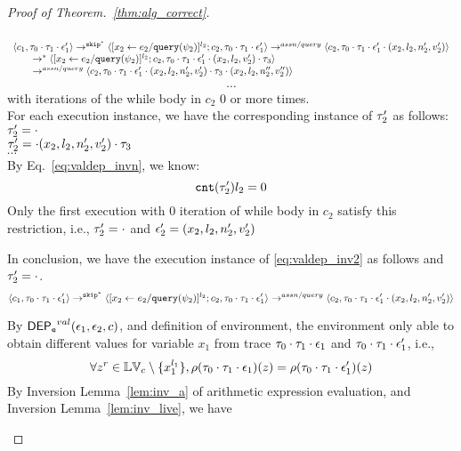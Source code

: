 \begin{proof}[Proof of Theorem.~\ref{thm:alg_correct}]
\begin{case}[$P(\cdot)$]
\begin{subproof}[Subproof]
\begin{enumerate}
\[ \]
%
  \[
  \begin{array}{l}
  \langle c_1, \mathtt{\tau}_0 \cdot \mathtt{\tau}_1 \cdot \mathtt{\epsilon}_1' \rangle 
  \rightarrow^{\mathtt{skip}^*} 
  \langle [\mathrel{ {x}_2 \leftarrow e_2 / {\tt query}(\psi_2) }]^{l_2} ; {c}_2, \mathtt{\tau}_0 \cdot \mathtt{\tau}_1 \cdot \mathtt{\epsilon}_1' \rangle 
  \rightarrow^{assn/query} 
  \langle {c}_2,  \mathtt{\tau}_0 \cdot \mathtt{\tau}_1 \cdot \mathtt{\epsilon}_1' \cdot (x_2, l_2, n_2', v_2') \rangle 
  \\ \qquad
  \rightarrow^{*} 
  \langle [\mathrel{ {x}_2 \leftarrow e_2 / {\tt query}(\psi_2) }]^{l_2} ; {c}_2, 
  \mathtt{\tau}_0 \cdot \mathtt{\tau}_1 \cdot \mathtt{\epsilon}_1' \cdot (x_2, l_2, v_2') \cdot \mathtt{\tau}_3 \rangle 
  \\ \qquad
  \rightarrow^{assn/query} 
  \langle {c}_2,  \mathtt{\tau}_0 \cdot \mathtt{\tau}_1 \cdot \mathtt{\epsilon}_1' \cdot (x_2, l_2, n_2', v_2') \cdot \mathtt{\tau}_3 \cdot (x_2, l_2, n_2'', v_2'') \rangle 
 \end{array}
 \]
\[
  \cdots
\] 
with iterations of the while body in $c_2$ $0$ or more times.
%
\\
%
For each execution instance, we have the corresponding instance of $\mathtt{\tau}_2'$ as follows:
\\
  $\mathtt{\tau}_2'  = \cdot$
\\
$\mathtt{\tau}_2' = \cdot (x_2, l_2, n_2', v_2') \cdot \mathtt{\tau}_3 $
%
\\
$\cdots$
%
\\
%
By Eq.~\ref{eq:valdep_invn}, we know:
%
\[
 \mathtt{cnt}(\mathtt{\tau}_2') l_2 = 0
\]
%
Only the first execution with 0 iteration of while body in $c_2$ satisfy this restriction, i.e., $\mathtt{\tau}_2' = \cdot$ and $\mathtt{\epsilon}_2' = (x_2, l_2, n_2', v_2')$
%
\end{enumerate}
In conclusion, we have the execution instance of \ref{eq:valdep_inv2}  as follows and $\mathtt{\tau}_2' = \cdot$.
  \[
  \langle c_1, \mathtt{\tau}_0 \cdot \mathtt{\tau}_1 \cdot \mathtt{\epsilon}_1' \rangle 
  \rightarrow^{\mathtt{skip}^*} 
  \langle [\mathrel{ {x}_2 \leftarrow e_2 / {\tt query}(\psi_2) }]^{l_2} ; {c}_2, \mathtt{\tau}_0 \cdot \mathtt{\tau}_1 \cdot \mathtt{\epsilon}_1' \rangle 
  \rightarrow^{assn/query} 
  \langle {c}_2,  \mathtt{\tau}_0 \cdot \mathtt{\tau}_1 \cdot \mathtt{\epsilon}_1' \cdot (x_2, l_2, n_2', v_2') \rangle 
 \]
\end{subproof}
%
By $\mathsf{DEP_{\mathtt{e}}}^{val}(\mathtt{\epsilon}_1, \mathtt{\epsilon}_2, c)$, and definition of environment, 
the environment only able to obtain different values for variable $x_1$ 
from trace $\mathtt{\tau}_0 \cdot \mathtt{\tau}_1 \cdot \mathtt{\epsilon}_1$ and 
$\mathtt{\tau}_0 \cdot \mathtt{\tau}_1 \cdot \mathtt{\epsilon}_1'$, i.e.,
\[
  \forall z^r \in \mathbb{LV}_c \setminus \{x_1^{l_1}\} ,
  \rho(\mathtt{\tau}_0 \cdot \mathtt{\tau}_1 \cdot \mathtt{\epsilon}_1) (z) =  
  \rho(\mathtt{\tau}_0 \cdot \mathtt{\tau}_1 \cdot \mathtt{\epsilon}_1') (z)
\]
%
By {Inversion Lemma~\ref{lem:inv_a}} of arithmetic expression evaluation, and Inversion Lemma~\ref{lem:inv_live}, we have 

\end{case}
\end{proof}
